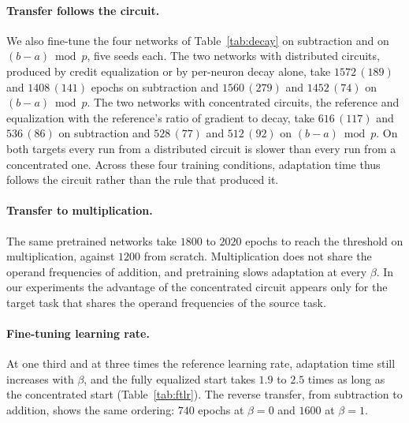 \documentclass{article} %
\begin{document}
\paragraph{Transfer follows the circuit.} We also fine-tune the four networks of Table~\ref{tab:decay} on subtraction and on $(b - a) \bmod p$, five seeds each. The two networks with distributed circuits, produced by credit equalization or by per-neuron decay alone, take $1572\,(189)$ and $1408\,(141)$ epochs on subtraction and $1560\,(279)$ and $1452\,(74)$ on $(b - a) \bmod p$. The two networks with concentrated circuits, the reference and equalization with the reference's ratio of gradient to decay, take $616\,(117)$ and $536\,(86)$ on subtraction and $528\,(77)$ and $512\,(92)$ on $(b - a) \bmod p$. On both targets every run from a distributed circuit is slower than every run from a concentrated one. Across these four training conditions, adaptation time thus follows the circuit rather than the rule that produced it.

\paragraph{Transfer to multiplication.} The same pretrained networks take $1800$ to $2020$ epochs to reach the threshold on multiplication, against $1200$ from scratch. Multiplication does not share the operand frequencies of addition, and pretraining slows adaptation at every $\beta$. In our experiments the advantage of the concentrated circuit appears only for the target task that shares the operand frequencies of the source task.

\paragraph{Fine-tuning learning rate.} At one third and at three times the reference learning rate, adaptation time still increases with $\beta$, and the fully equalized start takes $1.9$ to $2.5$ times as long as the concentrated start (Table~\ref{tab:ftlr}). The reverse transfer, from subtraction to addition, shows the same ordering: $740$ epochs at $\beta = 0$ and $1600$ at $\beta = 1$.
\end{document}
